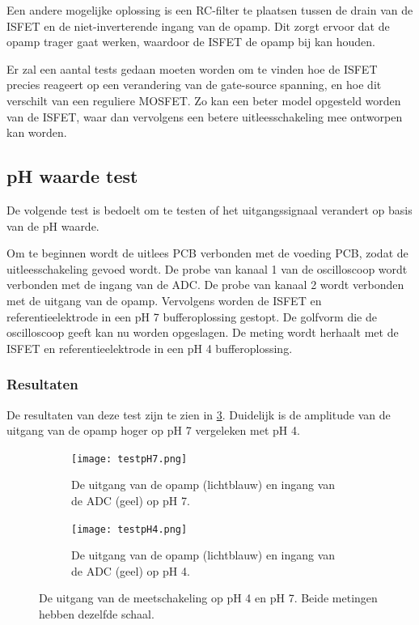 Een andere mogelijke oplossing is een RC-filter te plaatsen tussen de drain van de ISFET en de niet-inverterende ingang van de opamp. Dit zorgt ervoor dat de opamp trager gaat werken, waardoor de ISFET de opamp bij kan houden.

Er zal een aantal tests gedaan moeten worden om te vinden hoe de ISFET precies reageert op een verandering van de gate-source spanning, en hoe dit verschilt van een reguliere MOSFET. Zo kan een beter model opgesteld worden van de ISFET, waar dan vervolgens een betere uitleesschakeling mee ontworpen kan worden.


\subsection{pH waarde test}
De volgende test is bedoelt om te testen of het uitgangssignaal verandert op basis van de pH waarde.

Om te beginnen wordt de uitlees PCB verbonden met de voeding PCB, zodat de uitleesschakeling gevoed wordt. De probe van kanaal 1 van de oscilloscoop wordt verbonden met de ingang van de ADC. De probe van kanaal 2 wordt verbonden met de uitgang van de opamp. Vervolgens worden de ISFET en referentieelektrode in een pH 7 bufferoplossing gestopt. De golfvorm die de oscilloscoop geeft kan nu worden opgeslagen. De meting wordt herhaalt met de ISFET en referentieelektrode in een pH 4 bufferoplossing.

\subsubsection{Resultaten}
De resultaten van deze test zijn te zien in \cref{fig:resultspHMeasure}. Duidelijk is de amplitude van de uitgang van de opamp hoger op pH 7 vergeleken met pH 4.

\begin{figure}[!htbp]
    \centering
    \begin{subfigure}[b]{0.75\textwidth}
        \centering
        \def\svgwidth{\textwidth}
        \texttt{[image: testpH7.png]}
        \caption{De uitgang van de opamp (lichtblauw) en ingang van de ADC (geel) op pH 7.}
        \label{fig:resultpH7}
    \end{subfigure}
    \hfill
    \begin{subfigure}[b]{0.75\textwidth}
        \centering
        \def\svgwidth{\textwidth}
        \texttt{[image: testpH4.png]}
        \caption{De uitgang van de opamp (lichtblauw) en ingang van de ADC (geel) op pH 4.}
        \label{fig:resultpH4}
    \end{subfigure}
    \caption{De uitgang van de meetschakeling op pH 4 en pH 7. Beide metingen hebben dezelfde schaal.}
    \label{fig:resultspHMeasure}
\end{figure}

